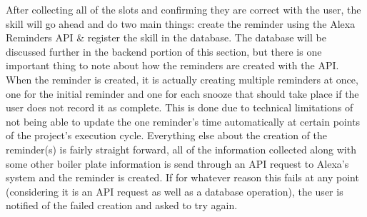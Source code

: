 \documentclass[11pt, oneside]{article}
\begin{document}
After collecting all of the slots and confirming they are correct with the user, the skill will go ahead and do two main things: create the reminder using the Alexa Reminders API \& register the skill in the database. 
The database will be discussed further in the backend portion of this section, but there is one important thing to note about how the reminders are created with the API. 
When the reminder is created, it is actually creating multiple reminders at once, one for the initial reminder and one for each snooze that should take place if the user does not record it as complete. 
This is done due to technical limitations of not being able to update the one reminder's time automatically at certain points of the project's execution cycle. 
Everything else about the creation of the reminder(s) is fairly straight forward, all of the information collected along with some other boiler plate information is send through an API request to Alexa's system and the reminder is created.
If for whatever reason this fails at any point (considering it is an API request as well as a database operation), the user is notified of the failed creation and asked to try again. 
\end{document}
